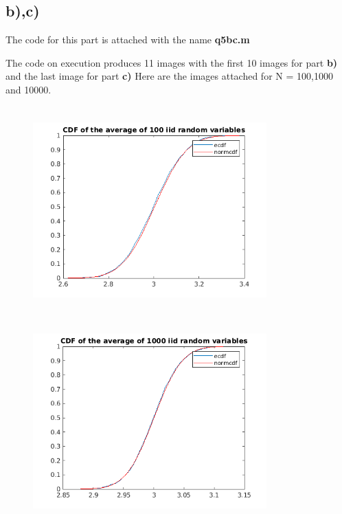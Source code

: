 \documentclass{article}
\begin{document}
\subsection*{b),c)} 
    The code for this part is attached with the name \textbf{q5bc.m}\par
    The code on execution produces 11 images with the first 10 images for part \textbf{b)} and the last image for part \textbf{c)}
    Here are the images attached for N = 100,1000 and 10000.\par 
    \begin{figure}[H]
    \begin{floatrow}
    {\includegraphics[width =9cm, height=8cm]{1.png}}
    {\includegraphics[width =9cm, height=8cm]{2.png}}
    \end{floatrow}

\end{figure}
\end{document}
